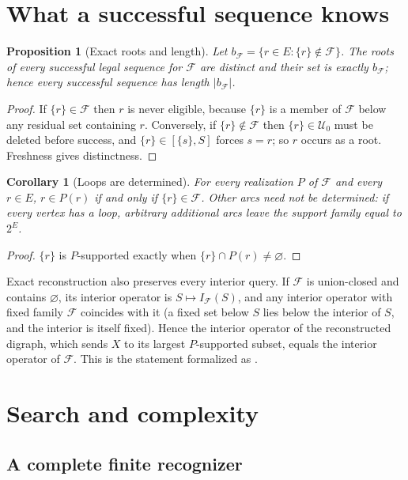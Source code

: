 \documentclass[11pt,a4paper]{article}
\theoremstyle{plain}
\newtheorem{proposition}[theorem]{Proposition}
\newtheorem{corollary}[theorem]{Corollary}
\theoremstyle{definition}
\theoremstyle{remark}
\newcommand{\cF}{\mathcal F}
\newcommand{\cU}{\mathcal U}
\newcommand{\Int}{I_{\cF}}
\newcommand{\ivl}[2]{[\{#1\},#2]}
\newcommand{\pw}[1]{2^{#1}}
\begin{document}
\section{What a successful sequence knows}\label{sec:traces}

\begin{proposition}[Exact roots and length]\label{prop:roots}
Let $b_{\cF}=\{r\in E:\{r\}\notin\cF\}$. The roots of every successful legal sequence for $\cF$ are distinct and their set is exactly $b_{\cF}$; hence every successful sequence has length $|b_{\cF}|$.
\end{proposition}

\begin{proof}
If $\{r\}\in\cF$ then $r$ is never eligible, because $\{r\}$ is a member of $\cF$ below any residual set containing $r$. Conversely, if $\{r\}\notin\cF$ then $\{r\}\in\cU_0$ must be deleted before success, and $\{r\}\in\ivl{s}{S}$ forces $s=r$; so $r$ occurs as a root. Freshness gives distinctness.
\end{proof}

\begin{corollary}[Loops are determined]\label{cor:loops}
For every realization $P$ of $\cF$ and every $r\in E$, $r\in P(r)$ if and only if $\{r\}\in\cF$. Other arcs need not be determined: if every vertex has a loop, arbitrary additional arcs leave the support family equal to $\pw{E}$.
\end{corollary}

\begin{proof}
$\{r\}$ is $P$-supported exactly when $\{r\}\cap P(r)\neq\varnothing$.
\end{proof}

Exact reconstruction also preserves every interior query. If $\cF$ is union-closed and contains $\varnothing$, its interior operator is $S\mapsto\Int(S)$, and any interior operator with fixed family $\cF$ coincides with it (a fixed set below $S$ lies below the interior of $S$, and the interior is itself fixed). Hence the interior operator of the reconstructed digraph, which sends $X$ to its largest $P$-supported subset, equals the interior operator of $\cF$. This is the statement formalized as .

\section{Search and complexity}\label{sec:search}

\subsection{A complete finite recognizer}
\end{document}
